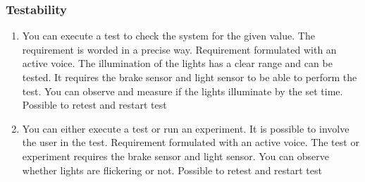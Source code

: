\subsubsection{Testability}
\begin{enumerate}
    \item{You can execute a test to check the system for the given value. The requirement is worded in a precise way. Requirement formulated with an active voice. The illumination of the lights has a clear range and can be tested. It requires the brake sensor and light sensor to be able to perform the test. You can observe and measure if the lights illuminate by the set time. Possible to retest and restart test}
    \item{You can either execute a test or run an experiment. It is possible to involve the user in the test. Requirement formulated with an active voice. The test or experiment requires the brake sensor and light sensor. You can observe whether lights are flickering or not. Possible to retest and restart test}
    

\end{enumerate}
